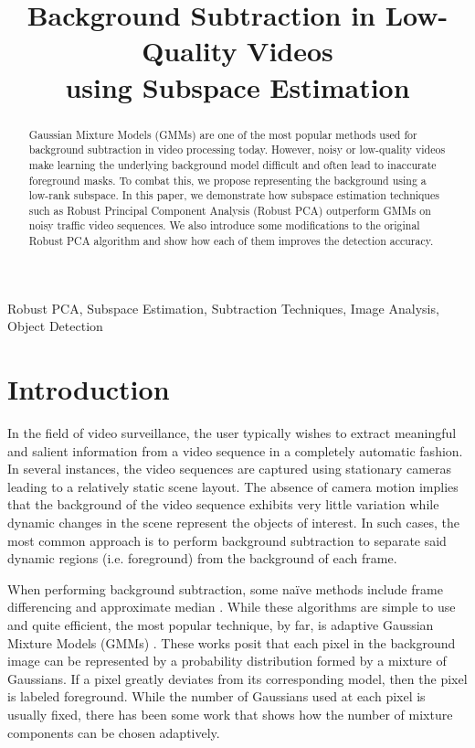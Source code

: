 \documentclass{article}
\title{Background Subtraction in Low-Quality Videos\\ using Subspace Estimation}
\begin{document}
%
\maketitle
%
\begin{abstract}
Gaussian Mixture Models (GMMs) are one of the most popular methods used for background subtraction in video processing today. However, noisy or low-quality videos make learning the underlying background model difficult and often lead to inaccurate foreground masks. To combat this, we propose representing the background using a low-rank subspace. In this paper, we demonstrate how subspace estimation techniques such as Robust Principal Component Analysis (Robust PCA) outperform GMMs on noisy traffic video sequences. We also introduce some modifications to the original Robust PCA algorithm and show how each of them improves the detection accuracy.
\end{abstract}
%
\begin{keywords}
Robust PCA, Subspace Estimation,  Subtraction Techniques, Image Analysis, Object Detection
\end{keywords}
%

\vspace{0.1in}

\section{Introduction}
In the field of video surveillance, the user typically wishes to extract meaningful and salient information from a video sequence in a completely automatic fashion. In several instances, the video sequences are captured using stationary cameras leading to a relatively static scene layout. The absence of camera motion implies that the background of the video sequence exhibits very little variation while dynamic changes in the scene represent the objects of interest. In such cases, the most common approach is to perform background subtraction to separate said dynamic regions (i.e. foreground) from the background of each frame.

When performing background subtraction, some na\"ive methods include frame differencing and approximate median \cite{approxMed}. %
While these algorithms are simple to use and quite efficient, the most popular technique, by far, is adaptive  Gaussian Mixture Models (GMMs) \cite{FriedmanGMM, StaufferGMM}. These works posit that each pixel in the background image can be represented by a probability distribution formed by a mixture of Gaussians. If a pixel greatly deviates from its corresponding model, then the pixel is labeled foreground. While the number of Gaussians used at each pixel is usually fixed, there has been some work \cite{ZivGMM} that shows how the number of mixture components can be chosen adaptively.
\end{document}
